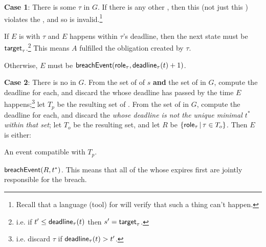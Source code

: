 \documentclass[12pt]{article}
\begin{document}
{\bf Case 1}: There is some \enabled \mustntran $\tau$ in $G$. If there is any other \enabled \transition, then this \Contract (not just this \trace) violates the \uaoc, and so is invalid.\footnote{Recall that a language (tool) for \FSContracts will verify that such a thing can't happen.} 
\begin{PPI}
    \item If $E$ is \compatible with $\tau$ and $E$ happens within $\tau$'s deadline, then the next state must be $\textsf{target}_{\tau}$.\footnote{i.e. if $t' \leq \textsf{deadline}_{\tau}(t)$ then $s' = \textsf{target}_{\tau}$.} This means $A$ fulfilled the obligation created by $\tau$.
    \item Otherwise, $E$ must be $\textsf{breachEvent}(\textsf{role}_{\tau},\textsf{deadline}_{\tau}(t) + 1)$. %
\end{PPI}

{\bf Case 2}: There is no \enabled \mustntran in $G$. From the set of \enabled \mayntrans of $s$ {\bf and} the set of \enabled \rmustntrans in $G$, compute the deadline for each, and discard the \transitions whose deadline has passed by the time $E$ happens;\footnote{i.e. discard $\tau$ if $\textsf{deadline}_{\tau}(t) > t'$.}  let $T_p$ be the resulting set of \transitions. From the set of \enabled \rmustntrans in $G$, compute the deadline for each, and discard the {\transitions} {\it whose deadline is not the unique minimal \TimeStamp $t^*$ within that set}; let $T_o$ be the resulting set, and let $R$ be $\{ \textsf{role}_{\tau} \, \vert \, \tau \in T_{o} \}$. Then $E$ is either:
\begin{PPI}
	\item An event compatible with $T_p$.
	\item $\textsf{breachEvent}(R,t^*)$. This means that all of the \Roles whose \enabled \rmustntran expires first are jointly responsible for the breach.
\end{PPI}	

\end{document}
